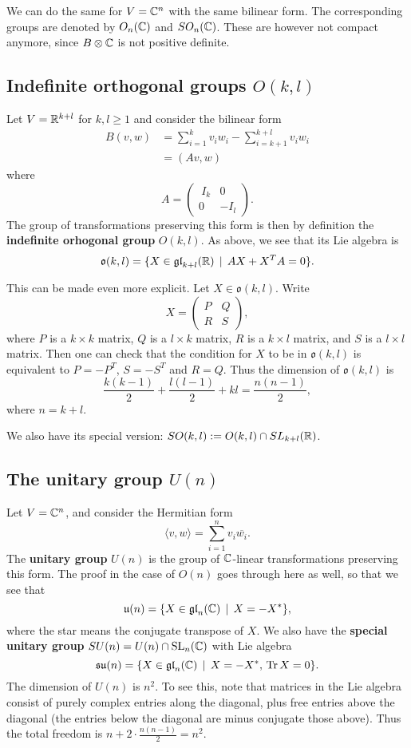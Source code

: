 \documentclass[11pt, english]{article}
\begin{document}
We can do the same for $V= \mathbb{C}^n$ with the same bilinear form. The corresponding groups are denoted by $O_n(\mathbb{C})$ and $SO_n(\mathbb{C})$. These are however not compact anymore, since $B \otimes \mathbb{C}$ is not positive definite.

\subsection{Indefinite orthogonal groups $O(k,l)$}

Let $V=\mathbb{R}^{k+l}$ for $k, l \geq 1$ and consider the bilinear form
\begin{align*}
B(v,w) &= \sum_{i=1}^k v_iw_i - \sum_{i=k+1}^{k+l} v_iw_i \\
&= (Av,w)
\end{align*}
where
$$
A = \begin{pmatrix} \
I_k &  0 \\
0 & -I_l \end{pmatrix}.
$$
The group of transformations preserving this form is then by definition the \textbf{indefinite orhogonal group} $O(k,l)$. As above, we see that its Lie algebra is
$$
\mathfrak{o}(k,l) = \{ X \in \mathfrak{gl}_{k+l}(\mathbb{R}) \, \mid \, AX+X^TA=0 \} . 
$$

This can be made even more explicit. Let $X \in \mathfrak{o}(k,l)$. Write
$$
X = \begin{pmatrix}
P & Q \\
R & S
\end{pmatrix},
$$
where $P$ is a $k \times k$ matrix, $Q$ is a $l \times k$ matrix, $R$ is a $k \times l$ matrix, and $S$ is a $l \times l$ matrix. Then one can check that the condition for $X$ to be in $\mathfrak{o}(k,l)$ is equivalent to $P=-P^T$, $S=-S^T$ and $R=Q$. Thus the dimension of $\mathfrak{o}(k,l)$ is
$$
\frac{k(k-1)}{2} + \frac{l(l-1)}{2} + kl = \frac{n(n-1)}{2},
$$
where $n=k+l$.

We also have its special version: $SO(k,l) := O(k,l) \cap SL_{k+l}(\mathbb{R})$. 

\subsection{The unitary group $U(n)$}

Let $V=\mathbb{C}^n$, and consider the Hermitian form
$$
\langle v, w \rangle = \sum_{i=1}^n v_i \overline{w_i}.
$$
The \textbf{unitary group} $U(n)$ is the group of $\mathbb{C}$-linear transformations preserving this form. The proof in the case of $O(n)$ goes through here as well, so that we see that
$$
\mathfrak{u}(n) = \{ X \in \mathfrak{gl}_n(\mathbb{C}) \, \mid \, X = -X^\ast \},
$$
where the star means the conjugate transpose of $X$. We also have the \textbf{special unitary group} $SU(n) = U(n) \cap \operatorname{SL}_n(\mathbb{C})$ with Lie algebra
$$
\mathfrak{su}(n) = \{ X \in \mathfrak{gl}_n(\mathbb{C}) \, \mid \, X = -X^\ast, \, \operatorname{Tr} X = 0\}.
$$
The dimension of $U(n)$ is $n^2$. To see this, note that matrices in the Lie algebra consist of purely complex entries along the diagonal, plus free entries above the diagonal (the entries below the diagonal are minus conjugate those above). Thus the total freedom is $n+2 \cdot \frac{n(n-1)}{2} = n^2$.
\end{document}
